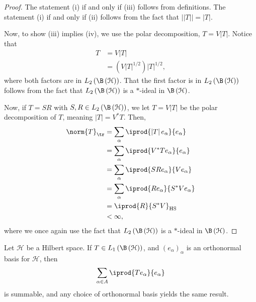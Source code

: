 \documentclass[10pt]{mypackage}
\DeclareMathOperator{\hs}{HS}
\begin{document}
\begin{proof}
  The statement (i) if and only if (iii) follows from definitions. The statement (i) if and only if (ii) follows from the fact that $\left\vert \left\vert T \right\vert \right\vert = \left\vert T \right\vert$.\newline

  Now, to show (iii) implies (iv), we use the polar decomposition, $T = V\left\vert T \right\vert$. Notice that
  \begin{align*}
    T &= V\left\vert T \right\vert\\
      &= \left( V\left\vert T \right\vert^{1/2} \right) \left\vert T \right\vert^{1/2},
  \end{align*}
  where both factors are in $L_2\left( \B\left( \mathcal{H} \right) \right)$. That the first factor is in $L_2\left( \B\left( \mathcal{H} \right) \right)$ follows from the fact that $L_2\left( \B\left( \mathcal{H} \right) \right)$ is a $\ast$-ideal in $\B\left( \mathcal{H} \right)$.\newline

  Now, if $T = SR$ with $S,R\in L_2\left( \B\left( \mathcal{H} \right) \right)$, we let $T = V\left\vert T \right\vert$ be the polar decomposition of $T$, meaning $\left\vert T \right\vert = V^{\ast}T$. Then,
  \begin{align*}
    \norm{T}_{\tr} &= \sum_{\alpha} \iprod{\left\vert T \right\vert e_{\alpha}}{e_{\alpha}}\\
                   &= \sum_{\alpha} \iprod{ V^{\ast}T e_{\alpha} }{e_{\alpha}}\\
                   &= \sum_{\alpha} \iprod{ SR e_{\alpha} }{V e_{\alpha}}\\
                   &= \sum_{\alpha} \iprod{Re_{\alpha}}{S^{\ast}Ve_{\alpha}}\\
                   &= \iprod{R}{S^{\ast}V}_{\hs}\\
                   &< \infty,
  \end{align*}
  where we once again use the fact that $L_2\left( \B\left( \mathcal{H} \right) \right)$ is a $\ast$-ideal in $\B\left( \mathcal{H} \right)$.
\end{proof}
\begin{lemma}
  Let $\mathcal{H}$ be a Hilbert space. If $T\in L_1\left( \B\left( \mathcal{H} \right) \right)$, and $\left( e_{\alpha} \right)_{\alpha}$ is an orthonormal basis for $\mathcal{H}$, then
  \begin{align*}
    \sum_{\alpha \in A} \iprod{Te_{\alpha}}{e_{\alpha}}
  \end{align*}
  is summable, and any choice of orthonormal basis yields the same result.
\end{lemma}
\end{document}
